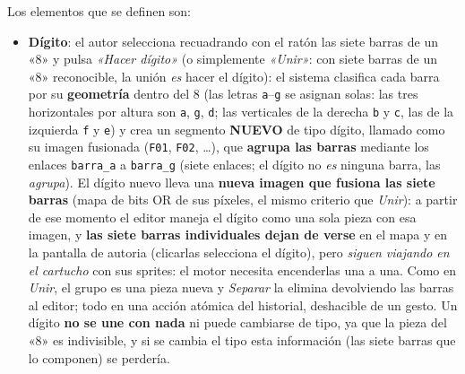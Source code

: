 Los elementos que se definen son:
\begin{itemize}
	\item \textbf{Dígito}: el autor selecciona recuadrando con el ratón las siete barras de un
	«8» y pulsa \emph{«Hacer dígito»} (o simplemente \emph{«Unir»}: con siete
	barras de un «8» reconocible, la unión \emph{es} hacer el dígito): el
	sistema clasifica cada barra por su \textbf{geometría} dentro del 8 (las
	letras \texttt{a}--\texttt{g} se asignan solas: las tres horizontales por
	altura son \texttt{a}, \texttt{g}, \texttt{d}; las verticales de la
	derecha \texttt{b} y \texttt{c}, las de la izquierda \texttt{f} y
	\texttt{e}) y crea un segmento \textbf{NUEVO} de tipo dígito, llamado
	como su imagen fusionada (\texttt{F01}, \texttt{F02}, \dots), que
	\textbf{agrupa las barras} mediante los enlaces \texttt{barra\_a} a
	\texttt{barra\_g} (siete enlaces; el dígito no \emph{es} ninguna barra, las
	\emph{agrupa}). El dígito nuevo lleva una \textbf{nueva imagen que fusiona
		las siete barras} (mapa de bits OR de sus píxeles, el mismo criterio que
	\emph{Unir}): a partir de ese momento el editor maneja el dígito como
	una sola pieza con esa imagen, y \textbf{las siete barras individuales dejan de verse}
	en el mapa y en la pantalla de autoria (clicarlas selecciona el dígito),
	pero \emph{siguen viajando en el cartucho} con sus sprites: el motor
	necesita encenderlas una a una.
	Como en \emph{Unir}, el grupo es una pieza nueva y \emph{Separar} la
	elimina devolviendo las barras al editor; todo en una acción atómica del
	historial, deshacible de un gesto. Un dígito \textbf{no se une con nada}
	ni puede cambiarse de tipo, ya que la pieza del «8» es indivisible, y si se cambia el tipo esta información (las siete barras que lo componen) se perdería.
	

\end{itemize}
